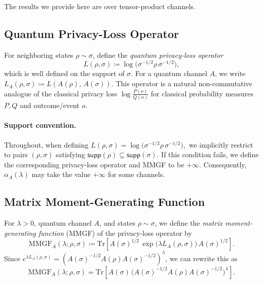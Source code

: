 \documentclass[11pt]{article}
\def\MMGF{\mathrm{MMGF}}
\def\Tr{\mathrm{Tr}}
\def\supp{\mathsf{supp}}
\theoremstyle{plain}
\theoremstyle{remark}
\begin{document}
The results we provide here are over tensor-product channels.

\subsection{Quantum Privacy-Loss Operator}

For neighboring states $\rho\sim\sigma$, define the \emph{quantum privacy-loss
operator}
\begin{equation}
    L(\rho,\sigma)
   \coloneqq \log\!\bigl(\sigma^{-1/2}\rho\,\sigma^{-1/2}\bigr),
\end{equation}
which is well defined on the support of $\sigma$.  
For a quantum channel $A$, we write \\
$
    L_{A}(\rho,\sigma)
    \coloneqq L(A(\rho),\,A(\sigma)).
$
This operator is a natural non-commutative analogue of the classical privacy
loss $\log \frac{P(o)}{Q(o)}$ for classical probability measures $P, Q$ and outcome/event $o$.

\paragraph{Support convention.}
Throughout, when defining
$L(\rho,\sigma)=\log\!\big(\sigma^{-1/2}\rho\,\sigma^{-1/2}\big),$
we implicitly restrict to pairs $(\rho,\sigma)$ satisfying
$\supp(\rho)\subseteq\supp(\sigma)$. If this condition fails, we define
the corresponding privacy-loss operator and MMGF to be $+\infty$.
Consequently, $\alpha_A(\lambda)$ may take the value $+\infty$ for some channels.


\subsection{Matrix Moment-Generating Function}
\label{sec:mmgf-and-exp-renyi}

For $\lambda>0$, quantum channel $A$, and states $\rho \sim\sigma$, we define the \emph{matrix moment-generating function} (MMGF) of
the privacy-loss operator by
\begin{equation}
\label{eq:mmgf-def}
    \MMGF_{A}(\lambda;\rho,\sigma)
    \coloneqq
    \Tr\!\left[
        A(\sigma)^{1/2}\,
        \exp\!\bigl(\lambda L_{A}(\rho,\sigma)\bigr)\,
        A(\sigma)^{1/2}
    \right].
\end{equation}
Since $e^{\lambda L_{A}(\rho, \sigma)} = (A(\sigma)^{-1/2}A(\rho)A(\sigma)^{-1/2})^{\lambda}$,
we can rewrite this as
\begin{equation}
\label{eq:mmgf-as-exp-renyi}
    \MMGF_{A}(\lambda;\rho,\sigma)
    =
    \Tr\!\left[
        A(\sigma)\,
        \bigl(
          A(\sigma)^{-1/2}A(\rho)A(\sigma)^{-1/2}
        \bigr)^{\lambda}
    \right].
\end{equation}
\end{document}
